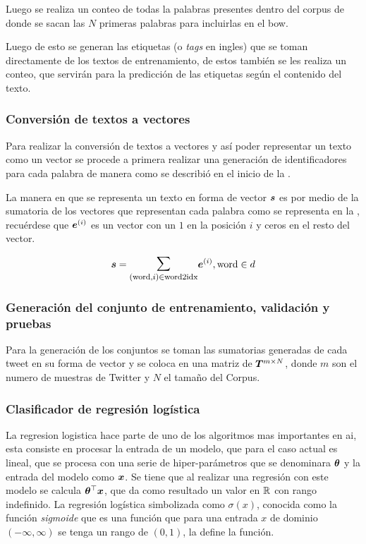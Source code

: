 Luego se realiza un conteo de todas la palabras presentes dentro del corpus de donde se sacan las $N$ primeras palabras para incluirlas en el \gls{bow}.

Luego de esto se generan las etiquetas (o \emph{tags} en ingles) que se toman directamente de los textos de entrenamiento, de estos también se les realiza un conteo, que servirán para la predicción de las etiquetas según el contenido del texto.

\subsubsection{Conversión de textos a vectores}
Para realizar la conversión de textos a vectores y así poder representar un texto como un vector se procede a primera realizar una generación de identificadores para cada palabra de manera como se describió en el inicio de la .

La manera en que se representa un texto en forma de vector ${\bm{s}}$ es por medio de la sumatoria de los vectores que representan cada palabra como se representa en la , recuérdese que ${\bm{e}}^{(i)}$ es un vector con un $1$ en la posición $i$ y ceros en el resto del vector.

\begin{equation} \label{eq:bow-word-vector-sum}
  \vs = \mathlarger{\mathlarger{\sum}}_{(\text{word}, i) \in \text{word2idx}} \ve^{(i)}, \text{word} \in d
\end{equation}

\subsubsection{Generación del conjunto de entrenamiento, validación y pruebas}
Para la generación de los conjuntos se toman las sumatorias generadas de cada tweet en su forma de vector y se coloca en una matriz de ${\bm{T}}^{m \times N}$, donde $m$ son el numero de muestras de Twitter y $N$ el tamaño del Corpus.

\subsubsection{Clasificador de regresión logística}
La regresion logistica hace parte de uno de los algoritmos mas importantes en \gls{ai}, esta consiste en procesar la entrada de un modelo, que para el caso actual es lineal, que se procesa con una serie de hiper-parámetros que se denominara ${\bm{\theta}}$ y la entrada del modelo como ${\bm{x}}$. Se tiene que al realizar una regresión con este modelo se calcula ${\bm{\theta}}^{\top} {\bm{x}}$, que da como resultado un valor en $\mathbb{R}$ con rango indefinido. La regresión logística simbolizada como $\sigma(x)$, conocida como la función \emph{sigmoide} que es una función que para una entrada $x$ de dominio $(-\infty, \infty)$ se tenga un rango de $(0, 1)$, la  define la función.


